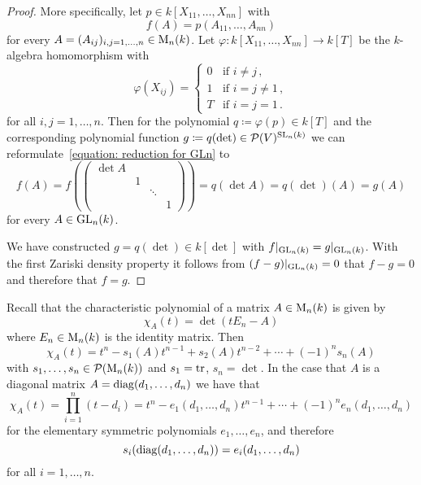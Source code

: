 \begin{proof}
  More specifically, let $p \in k[X_{11}, \dotsc, X_{nn}]$ with
  \[
      f(A)
    = p(A_{11}, \dotsc, A_{nn})
  \]
  for every $A = (A_{ij})_{i,j=1,\dotsc,n} \in \operatorname{M}_n(k)$.
  Let $\varphi \colon k[X_{11}, \dotsc, X_{nn}] \to k[T]$ be the $k$-algebra homomorphism with
  \[
      \varphi(X_{ij})
    = \begin{cases}
        0 & \text{if $i \neq j$}      \,, \\
        1 & \text{if $i = j \neq 1$}  \,, \\
        T & \text{if $i = j = 1$}     \,.
      \end{cases}
  \]
  for all $i,j = 1, \dotsc, n$.
  Then for the polynomial $q \coloneqq \varphi(p) \in k[T]$ and the corresponding polynomial function $g \coloneqq q(\det) \in \mathcal{P}(V)^{\operatorname{SL}_n(k)}$ we can reformulate~\eqref{equation: reduction for GLn} to
 \begin{equation}
      f(A)
    = f\left(
        \begin{pmatrix}
          \det A  &   &         &   \\
                  & 1 &         &   \\
                  &   & \ddots  &   \\
                  &   &         & 1
        \end{pmatrix}
      \right)
    = q(\det A)
    = q(\det)(A)
    = g(A)
  \end{equation}
  for every $A \in \operatorname{GL}_n(k)$.
  
  We have constructed $g = q(\det) \in k[\det]$ with $f|_{\operatorname{GL}_n(k)} = g|_{\operatorname{GL}_n(k)}$.
  With the first Zariski density property it follows from $(f - g)|_{\operatorname{GL}_n(k)} = 0$ that $f - g = 0$ and therefore that $f = g$.
\end{proof}


\begin{fluff}
  Recall that the characteristic polynomial of a matrix $A \in \operatorname{M}_n(k)$ is given by
  \[
      \chi_A(t)
    = \det(t E_n - A)
  \]
  where $E_n \in \operatorname{M}_n(k)$ is the identity matrix.
  Then
  \[
      \chi_A(t)
    = t^n - s_1(A) t^{n-1} + s_2(A) t^{n-2} + \dotsb + (-1)^n s_n(A)
  \]
  with $s_1, \dotsc, s_n \in \mathcal{P}(\operatorname{M}_n(k))$ and $s_1 = \operatorname{tr}$, $s_n = \det$.
  In the case that $A$ is a diagonal matrix $A = \operatorname{diag}(d_1, \dotsc, d_n)$ we have that
  \[
      \chi_A(t)
    = \prod_{i=1}^n (t-d_i)
    = t^n - e_1(d_1, \dotsc, d_n) t^{n-1} + \dotsb + (-1)^n e_n(d_1, \dotsc, d_n)
  \]
  for the elementary symmetric polynomials $e_1, \dotsc, e_n$, and therefore
  \[
      s_i(\operatorname{diag}(d_1, \dotsc, d_n))
    = e_i(d_1, \dotsc, d_n)
  \]
  for all $i = 1, \dotsc, n$.
\end{fluff}


